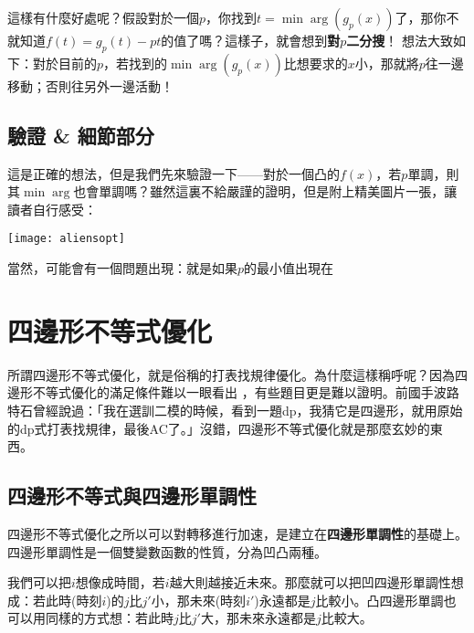 		這樣有什麼好處呢？假設對於一個$p$，你找到$t = \min \arg(g_p(x))$了，那你不就知道$f(t) = g_p(t) - pt$的值了嗎？這樣子，就會想到\textbf{對$p$二分搜}！
			想法大致如下：對於目前的$p$，若找到的$\min\arg(g_p(x))$比想要求的$x$小，那就將$p$往一邊移動；否則往另外一邊活動！
	\subsection{驗證 \& 細節部分}
		這是正確的想法，但是我們先來驗證一下——對於一個凸的$f(x)$，若$p$單調，則其$\min\arg$也會單調嗎？雖然這裏不給嚴謹的證明，但是附上精美圖片一張，讓讀者自行感受：
		\begin{center}
			\texttt{[image: aliensopt]}
		\end{center}
		當然，可能會有一個問題出現：就是如果$p$的最小值出現在
	\section{四邊形不等式優化}
	
	所謂四邊形不等式優化，就是俗稱的打表找規律優化。為什麼這樣稱呼呢？因為四邊形不等式優化的滿足條件難以一眼看出  ，有些題目更是難以證明。前國手波路特石曾經說過：「我在選訓二模的時候，看到一題dp，我猜它是四邊形，就用原始的dp式打表找規律，最後AC了。」沒錯，四邊形不等式優化就是那麼玄妙的東西。
	
	\subsection{四邊形不等式與四邊形單調性}
	
	四邊形不等式優化之所以可以對轉移進行加速，是建立在\textbf{四邊形單調性}的基礎上。四邊形單調性是一個雙變數函數的性質，分為凹凸兩種。\\
	
	
	我們可以把$i$想像成時間，若$i$越大則越接近未來。那麼就可以把凹四邊形單調性想成：若此時(時刻$i$)的$j$比$j'$小，那未來(時刻$i'$)永遠都是$j$比較小。凸四邊形單調也可以用同樣的方式想：若此時$j$比$j'$大，那未來永遠都是$j$比較大。\\
	
